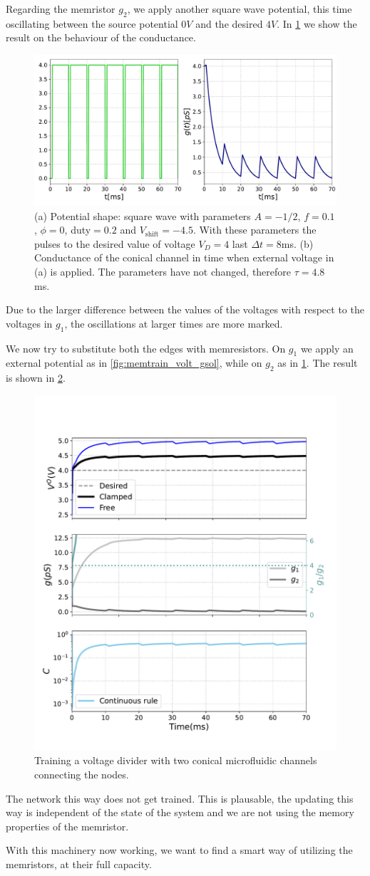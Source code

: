 \documentclass[10.5pt]{article}
\begin{document}
Regarding the memristor $g_2$, we apply another square wave potential, this time oscillating between the source potential $0V$ and the desired $4V$. In \cref{fig:memtrain_volt_gsol_g2} we show the result on the behaviour of the conductance.
\begin{figure}[h]
    \centering
    \includegraphics[width=0.7\columnwidth]{../figures_tex/memtrain_volt_gsol_g2.pdf}
    \caption{(a) Potential shape: square wave with parameters $A=-1/2$, $f = 0.1$, $\phi=0$, duty$=0.2$ and $V_{\text{shift}}=-4.5$. With these parameters the pulses to the desired value of voltage $V_D=4$ last $\Delta t = 8$ms. (b) Conductance of the conical channel in time when external voltage in (a) is applied. The parameters have not changed, therefore $\tau = 4.8$ms.}
    \label{fig:memtrain_volt_gsol_g2}
\end{figure}
Due to the larger difference between the values of the voltages with respect to the voltages in $g_1$, the oscillations at larger times are more marked.

We now try to substitute both the edges with memresistors. On $g_1$ we apply an external potential as in \cref{fig:memtrain_volt_gsol}, while on $g_2$ as in \cref{fig:memtrain_volt_gsol_g2}. The result is shown in \cref{fig:memr_memr_simple}.
\begin{figure}[h]
    \centering
    \includegraphics[width=0.6\columnwidth]{../figures_tex/memr_memr_simple.pdf}
    \caption{Training a voltage divider with two conical microfluidic channels connecting the nodes.}
    \label{fig:memr_memr_simple}
\end{figure}
The network this way does not get trained. This is plausable, the updating this way is independent of the state of the system and we are not using the memory properties of the memristor.  

With this machinery now working, we want to find a smart way of utilizing the memristors, at their full capacity.


\clearpage


 

\end{document}
